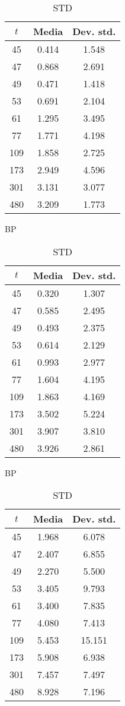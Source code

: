 \begin{table}[ht]
\centering
\begin{subtable}{0.33\textwidth}
\centering
{\tablecolors
\begin{tabular}{|c|c|c|}
\hline
$t$ & Media & Dev. std. \\
\hline
45 & 0.414 & 1.548 \\
\hline
47 & 0.868 & 2.691 \\
\hline
49 & 0.471 & 1.418 \\
\hline
53 & 0.691 & 2.104 \\
\hline
61 & 1.295 & 3.495 \\
\hline
77 & 1.771 & 4.198 \\
\hline
109 & 1.858 & 2.725 \\
\hline
173 & 2.949 & 4.596 \\
\hline
301 & 3.131 & 3.077 \\
\hline
480 & 3.209 & 1.773 \\
\hline
\end{tabular}}
\caption{\uo{} BP}
\end{subtable}%
\begin{subtable}{0.33\textwidth}
\centering
{\tablecolors
\begin{tabular}{|c|c|c|}
\hline
$t$ & Media & Dev. std. \\
\hline
45 & 0.320 & 1.307 \\
\hline
47 & 0.585 & 2.495 \\
\hline
49 & 0.493 & 2.375 \\
\hline
53 & 0.614 & 2.129 \\
\hline
61 & 0.993 & 2.977 \\
\hline
77 & 1.604 & 4.195 \\
\hline
109 & 1.863 & 4.169 \\
\hline
173 & 3.502 & 5.224 \\
\hline
301 & 3.907 & 3.810 \\
\hline
480 & 3.926 & 2.861 \\
\hline
\end{tabular}}
\caption{\pp{} BP}
\end{subtable}%
\begin{subtable}{0.33\textwidth}
\centering
{\tablecolors
\begin{tabular}{|c|c|c|}
\hline
$t$ & Media & Dev. std. \\
\hline
45 & 1.968 & 6.078 \\
\hline
47 & 2.407 & 6.855 \\
\hline
49 & 2.270 & 5.500 \\
\hline
53 & 3.405 & 9.793 \\
\hline
61 & 3.400 & 7.835 \\
\hline
77 & 4.080 & 7.413 \\
\hline
109 & 5.453 & 15.151 \\
\hline
173 & 5.908 & 6.938 \\
\hline
301 & 7.457 & 7.497 \\
\hline
480 & 8.928 & 7.196 \\
\hline
\end{tabular}}
\caption{\uo{} STD}
\end{subtable}


\end{table}
